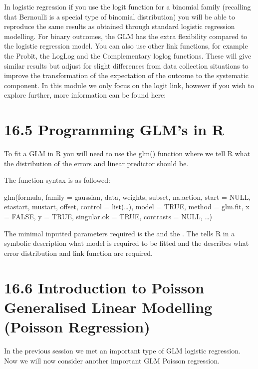 \documentclass[letterpaper,10pt,english]{jupyterBook}
\begin{document}
\sphinxAtStartPar
In logistic regression if you use the logit function for a binomial family (recalling that Bernoulli is a special type of binomial distribution)  you will be able to reproduce the same results as obtained through standard logistic regression modelling. For binary outcomes, the GLM has the extra flexibility compared to the logistic regression model. You can also use other link functions, for example the Probit, the Log\sphinxhyphen{}Log and the Complementary log\sphinxhyphen{}log functions. These will give similar results but adjust for slight differences from data collection situations to improve the transformation of the expectation of the outcome to the systematic component. In this module we only focus on the logit link, however if you wish to explore further, more information can be found here: 


\section{16.5 Programming GLM’s in R}
\label{\detokenize{16.f. Generalised Linear Model (GLM):programming-glm-s-in-r}}\label{\detokenize{16.f. Generalised Linear Model (GLM)::doc}}
\sphinxAtStartPar
To fit a GLM in R you will need to use the glm() function where we tell R what the distribution of the errors and linear predictor should be.

\sphinxAtStartPar
The function syntax is as followed:

\begin{sphinxVerbatim}[commandchars=\\\{\}]
glm(formula, family = gaussian, data, weights, subset,
na.action, start = NULL, etastart, mustart, offset,
control = list(…), model = TRUE, method = \PYGZdq{}glm.fit\PYGZdq{},
x = FALSE, y = TRUE, singular.ok = TRUE, contrasts = NULL, …)
\end{sphinxVerbatim}

\sphinxAtStartPar
The minimal inputted parameters required is the  and the . The  tells R in a symbolic description what model is required to be fitted and the  describes what error distribution and link function are required.


\section{16.6 Introduction to Poisson Generalised Linear Modelling (Poisson Regression)}
\label{\detokenize{16.g. Generalised Linear Model (GLM):introduction-to-poisson-generalised-linear-modelling-poisson-regression}}\label{\detokenize{16.g. Generalised Linear Model (GLM)::doc}}
\sphinxAtStartPar
In the previous session we met an important type of GLM \sphinxhyphen{} logistic regression. Now we will now consider another important GLM \sphinxhyphen{} Poisson regression.
\end{document}
